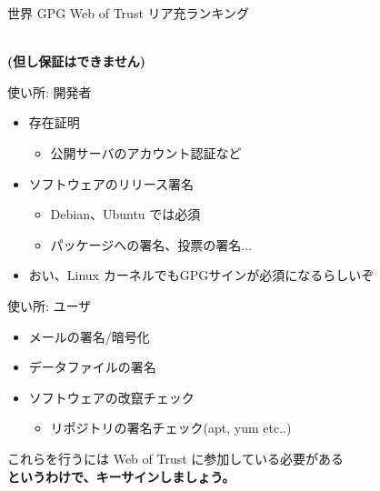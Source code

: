 \begin{frame}{世界 GPG Web of Trust リア充ランキング}

\begin{center}\large\bfseries
{}\\
(但し保証はできません)
\end{center}
\end{frame}

\begin{frame}{使い所: 開発者}
\begin{itemize}
  \item 存在証明
  \begin{itemize}
    \item 公開サーバのアカウント認証など
  \end{itemize}
  \item ソフトウェアのリリース署名
  \begin{itemize}
    \item Debian、Ubuntu では必須
    \item パッケージへの署名、投票の署名...
  \end{itemize}
  \item おい、Linux カーネルでもGPGサインが必須になるらしいぞ
\end{itemize}
\end{frame}

\begin{frame}{使い所: ユーザ}
\begin{itemize}
  \item メールの署名/暗号化
  \item データファイルの署名
  \item ソフトウェアの改竄チェック
  \begin{itemize}
    \item リポジトリの署名チェック(apt, yum etc..)
  \end{itemize}
\end{itemize}
\end{frame}


\begin{frame}
  \begin{center}

これらを行うには Web of Trust に参加している必要がある \\ \pause
\Huge\bfseries 
というわけで、キーサインしましょう。
  \end{center}
\end{frame}


